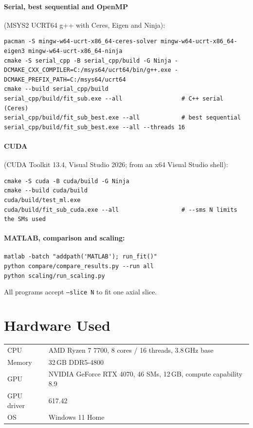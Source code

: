 \documentclass[11pt]{article}
\begin{document}
\paragraph{Serial, best sequential and OpenMP} (MSYS2 UCRT64 g++ with Ceres, Eigen and Ninja):
\begin{lstlisting}[numbers=none]
pacman -S mingw-w64-ucrt-x86_64-ceres-solver mingw-w64-ucrt-x86_64-eigen3 mingw-w64-ucrt-x86_64-ninja
cmake -S serial_cpp -B serial_cpp/build -G Ninja -DCMAKE_CXX_COMPILER=C:/msys64/ucrt64/bin/g++.exe -DCMAKE_PREFIX_PATH=C:/msys64/ucrt64
cmake --build serial_cpp/build
serial_cpp/build/fit_sub.exe --all                 # C++ serial (Ceres)
serial_cpp/build/fit_sub_best.exe --all            # best sequential
serial_cpp/build/fit_sub_best.exe --all --threads 16
\end{lstlisting}

\paragraph{CUDA} (CUDA Toolkit 13.4, Visual Studio 2026; from an x64 Visual Studio shell):
\begin{lstlisting}[numbers=none]
cmake -S cuda -B cuda/build -G Ninja
cmake --build cuda/build
cuda/build/test_ml.exe
cuda/build/fit_sub_cuda.exe --all                  # --sms N limits the SMs used
\end{lstlisting}

\paragraph{MATLAB, comparison and scaling:}
\begin{lstlisting}[numbers=none]
matlab -batch "addpath('MATLAB'); run_fit()"
python compare/compare_results.py --run all
python scaling/run_scaling.py
\end{lstlisting}
All programs accept \texttt{--slice N} to fit one axial slice.

\section{Hardware Used}

\begin{tabular}{ll}
CPU & AMD Ryzen 7 7700, 8 cores / 16 threads, 3.8\,GHz base \\
Memory & 32\,GB DDR5-4800 \\
GPU & NVIDIA GeForce RTX 4070, 46 SMs, 12\,GB, compute capability 8.9 \\
GPU driver & 617.42 \\
OS & Windows 11 Home \\
\end{tabular}
\end{document}
